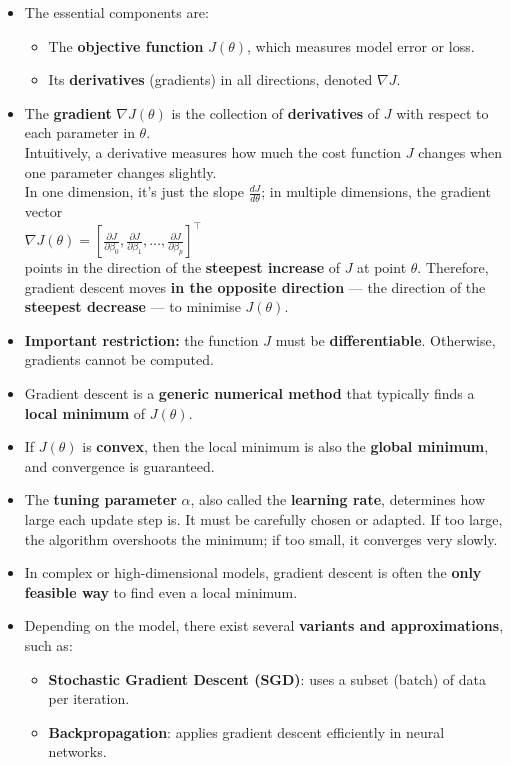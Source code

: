 \documentclass[
  letterpaper,
  DIV=11,
  numbers=noendperiod]{scrartcl}
\providecommand{\tightlist}{%
  \setlength{\itemsep}{0pt}\setlength{\parskip}{0pt}}\usepackage{longtable,booktabs,array}
\begin{document}
\begin{itemize}
\item
  The essential components are:

  \begin{itemize}
  \tightlist
  \item
    The \textbf{objective function} \(J(\theta)\), which measures model
    error or loss.
  \item
    Its \textbf{derivatives} (gradients) in all directions, denoted
    \(\nabla J\).
  \end{itemize}
\item
  The \textbf{gradient} \(\nabla J(\theta)\) is the collection of
  \textbf{derivatives} of \(J\) with respect to each parameter in
  \(\theta\).\\
  Intuitively, a derivative measures how much the cost function \(J\)
  changes when one parameter changes slightly.\\
  In one dimension, it's just the slope \(\frac{dJ}{d\theta}\); in
  multiple dimensions, the gradient vector\\
  \(\nabla J(\theta) = \left[\frac{\partial J}{\partial \beta_0}, \frac{\partial J}{\partial \beta_1}, \ldots, \frac{\partial J}{\partial \beta_p}\right]^\top\)\\
  points in the direction of the \textbf{steepest increase} of \(J\) at
  point \(\theta\). Therefore, gradient descent moves \textbf{in the
  opposite direction} --- the direction of the \textbf{steepest
  decrease} --- to minimise \(J(\theta)\).
\item
  \textbf{Important restriction:} the function \(J\) must be
  \textbf{differentiable}. Otherwise, gradients cannot be computed.
\item
  Gradient descent is a \textbf{generic numerical method} that typically
  finds a \textbf{local minimum} of \(J(\theta)\).
\item
  If \(J(\theta)\) is \textbf{convex}, then the local minimum is also
  the \textbf{global minimum}, and convergence is guaranteed.
\item
  The \textbf{tuning parameter} \(\alpha\), also called the
  \textbf{learning rate}, determines how large each update step is. It
  must be carefully chosen or adapted. If too large, the algorithm
  overshoots the minimum; if too small, it converges very slowly.
\item
  In complex or high-dimensional models, gradient descent is often the
  \textbf{only feasible way} to find even a local minimum.
\item
  Depending on the model, there exist several \textbf{variants and
  approximations}, such as:

  \begin{itemize}
  \tightlist
  \item
    \textbf{Stochastic Gradient Descent (SGD)}: uses a subset (batch) of
    data per iteration.
  \item
    \textbf{Backpropagation}: applies gradient descent efficiently in
    neural networks.
  \end{itemize}
\end{itemize}
\end{document}
